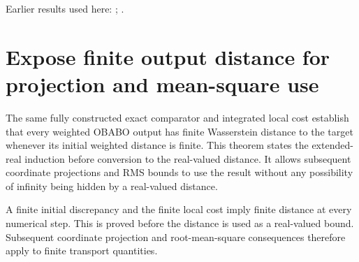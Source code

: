 \documentclass[11pt,a4paper]{article}
\begin{document}
Earlier results used here: \cite[Section~3.17.3]{LangevinLean2026ULASC}; \cite[Section~3.17.4]{LangevinLean2026ULASC}.

\section{\texorpdfstring{Expose finite output distance for projection and mean-square use}{Expose finite output distance for projection and mean-square use}}


The same fully constructed exact comparator and integrated local cost establish that every weighted OBABO output has finite Wasserstein distance to the target whenever its initial weighted distance is finite. This theorem states the extended-real induction before conversion to the real-valued distance. It allows subsequent coordinate projections and RMS bounds to use the result without any possibility of infinity being hidden by a real-valued distance.



A finite initial discrepancy and the finite local cost imply finite distance at every numerical step. This is proved before the distance is used as a real-valued bound. Subsequent coordinate projection and root-mean-square consequences therefore apply to finite transport quantities.
\end{document}
